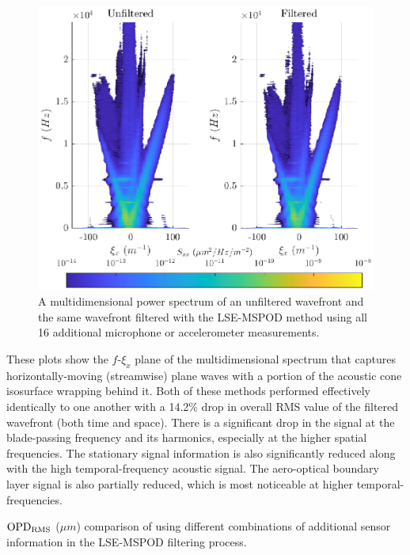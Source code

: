 \begin{figure}
  \centering
  \includegraphics{../matlab/07_multiple_sensor_filtering/lse_mspod.eps}
  \caption{A multidimensional power spectrum of an unfiltered wavefront and the same wavefront filtered with the LSE-MSPOD method using all 16 additional microphone or accelerometer measurements.  }
  \label{fig:07_lse_mspod}
\end{figure}
These plots show the $f$-$\xi_x$ plane of the multidimensional spectrum that captures horizontally-moving (streamwise) plane waves with a portion of the acoustic cone isosurface wrapping behind it.
Both of these methods performed effectively identically to one another with a 14.2\% drop in overall RMS value of the filtered wavefront (both time and space).
There is a significant drop in the signal at the blade-passing frequency and its harmonics, especially at the higher spatial frequencies.
The stationary signal information is also significantly reduced along with the high temporal-frequency acoustic signal.
The aero-optical boundary layer signal is also partially reduced, which is most noticeable at higher temporal-frequencies.

\begin{table}
  \centering
  \caption{$\operatorname{OPD_{RMS}}$ ($\mu m$) comparison of using different combinations of additional sensor information in the LSE-MSPOD filtering process.}
  
  \label{tab:07_lse_mspod_table}
\end{table}

